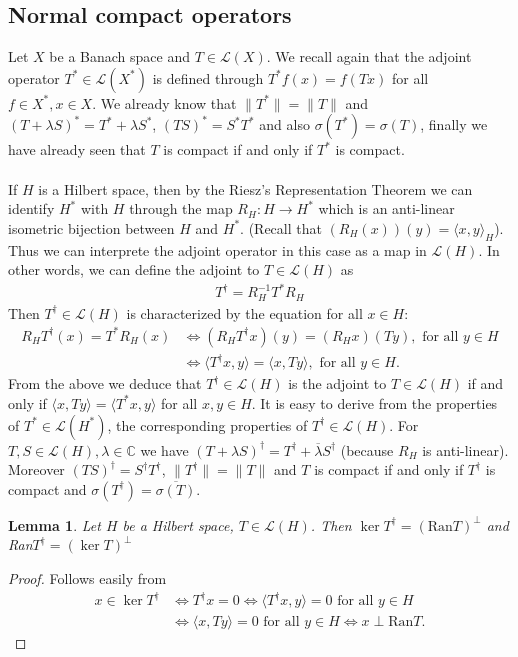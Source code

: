 \documentclass[11pt,a4paper]{article}
\newtheorem{lem}{Lemma}[section]
\theoremstyle{definition}
\begin{document}
\subsection{Normal compact operators}
Let $X$ be a Banach space and $T \in \mathcal{L}(X)$. We recall again that the adjoint operator $T^* \in \mathcal{L}(X^*)$ is defined through $T^*f(x)=f(Tx)$ for all $f \in X^*,x \in X$. We already know that $\|T^*\| = \|T\|$ and $(T + \lambda S)^*=T^* + \lambda S^*$, $(TS)^*= S^*T^*$ and also $\sigma(T^*)= \sigma(T)$, finally we have already seen that $T$ is compact if and only if $T^*$ is compact. 
\\\\
If $H$ is a Hilbert space, then by the Riesz's Representation Theorem we can identify $H^*$ with $H$ through the map $R_H: H \to H^*$ which is an anti-linear isometric bijection between $H$ and $H^*$. (Recall that $(R_H(x))(y)= \langle x,y \rangle_H$). Thus we can interprete the adjoint operator in this case as a map in $\mathcal{L}(H)$. In other words, we can define the adjoint to $T \in \mathcal{L}(H)$ as 
\begin{align*}
T^\dag = R_H^{-1}T^* R_H
\end{align*}
Then $T^\dag \in \mathcal{L}(H)$ is characterized by the equation for all $x \in H$:
\begin{align*}
R_H T^\dag (x) = T^* R_H(x) &\iff (R_H T^\dag x)(y) = (R_Hx)(Ty), \text{ for all } y \in H \\
& \iff \langle T^\dag x, y \rangle = \langle x, Ty \rangle, \text{ for all }  y \in H.
\end{align*}
From the above we deduce that $T^\dag \in \mathcal{L}(H)$ is the adjoint to $T \in \mathcal{L}(H)$ if and only if $\langle x,Ty \rangle = \langle T^*x, y \rangle$ for all $x,y \in H$. \newpage
It is easy to derive from the properties of $T^* \in \mathcal{L}(H^*)$, the corresponding properties of $T^\dag \in \mathcal{L}(H)$. For $T,S \in \mathcal{L}(H), \lambda \in \mathbb{C}$ we have $(T+ \lambda S)^\dag = T^\dag + \overline{\lambda}S^\dag$ (because $R_H$ is anti-linear). Moreover $(TS)^\dag = S^\dag T^\dag$, $\|T^\dag\| = \|T\|$ and $T$ is compact if and only if $T^\dag$ is compact and $\sigma(T^\dag)= \overline{\sigma(T)}$.
\begin{lem} Let $H$ be a Hilbert space, $T \in \mathcal{L}(H)$. Then $\ker T^\dag = (\text{Ran}T)^\perp$ and Ran$T^\dag = (\ker T)^\perp$
\end{lem} 
\begin{proof} Follows easily from
\begin{align*}
x \in \ker T^\dag &\iff T^\dag x=0 \iff \langle T^\dag x, y \rangle =0 \text{ for all } y \in H \\
&\iff \langle x,Ty \rangle =0 \text{ for all } y \in H \iff x \perp \text{Ran}T.
\end{align*}
\end{proof}
\end{document}
